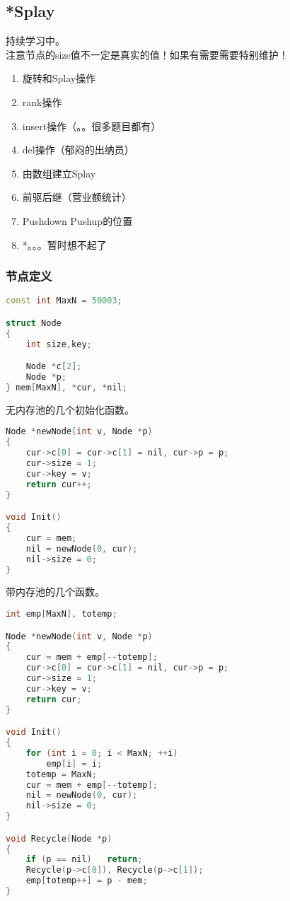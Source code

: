 \subsection{*Splay}
	持续学习中。\\
	注意节点的size值不一定是真实的值！如果有需要需要特别维护！\\
	\begin{enumerate}
	  \item 旋转和Splay操作
	  \item rank操作
	  \item insert操作（。。很多题目都有）
	  \item del操作（郁闷的出纳员）
	  \item 由数组建立Splay
	  \item 前驱后继（营业额统计）
	  \item Pushdown Pushup的位置
	  \item *。。。暂时想不起了
	\end{enumerate}
	
	\subsubsection{节点定义}
	\begin{lstlisting}[language=c++]
const int MaxN = 50003;

struct Node
{
	int size,key;

	Node *c[2];
	Node *p;
} mem[MaxN], *cur, *nil;
	\end{lstlisting}
	无内存池的几个初始化函数。\\
	\begin{lstlisting}[language=c++]
Node *newNode(int v, Node *p)
{
	cur->c[0] = cur->c[1] = nil, cur->p = p;
	cur->size = 1;
	cur->key = v;
	return cur++;
}

void Init()
{
	cur = mem;
	nil = newNode(0, cur);
	nil->size = 0;
}
	\end{lstlisting}
	带内存池的几个函数。\\
	\begin{lstlisting}[language=c++]
int emp[MaxN], totemp;

Node *newNode(int v, Node *p)
{
	cur = mem + emp[--totemp];
	cur->c[0] = cur->c[1] = nil, cur->p = p;
	cur->size = 1;
	cur->key = v;
	return cur;
}

void Init()
{
	for (int i = 0; i < MaxN; ++i)
		emp[i] = i;
	totemp = MaxN;
	cur = mem + emp[--totemp];
	nil = newNode(0, cur);
	nil->size = 0;
}

void Recycle(Node *p)
{
	if (p == nil)   return;
	Recycle(p->c[0]), Recycle(p->c[1]);
	emp[totemp++] = p - mem;
}
	\end{lstlisting}
